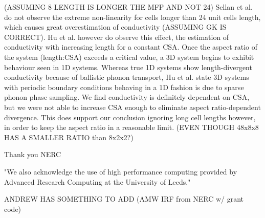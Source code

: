 \documentclass[%
preprint,                                  %
nofootinbib,
 amsmath,amssymb,
 aps,
]{revtex4-1}
\begin{document}
(ASSUMING 8 LENGTH IS LONGER THE MFP AND NOT 24) Sellan et al. do not observe the extreme non-linearity for cells longer than 24 unit cells length, which causes great overestimation of conductivity (ASSUMING GK IS CORRECT). Hu et al. however do observe this effect, the estimation of conductivity with increasing length for a constant CSA. Once the aspect ratio of the system (length:CSA) exceeds a critical value, a 3D system begins to exhibit behaviour seen in 1D systems. Whereas true 1D systems show length-divergent conductivity because of ballistic phonon transport, Hu et al. state 3D systems with periodic boundary conditions behaving in a 1D fashion is due to sparse phonon phase sampling. We find conductivity is definitely dependent on CSA, but we were not able to increase CSA enough to eliminate aspect ratio-dependent divergence. This does support our conclusion ignoring long cell lengths however, in order to keep the aspect ratio in a reasonable limit. (EVEN THOUGH 48x8x8 HAS A SMALLER RATIO than 8x2x2?)

\begin{acknowledgements}
Thank you NERC

"We also acknowledge the use of high performance computing provided by Advanced Research Computing at the University of Leeds."

ANDREW HAS SOMETHING TO ADD (AMW IRF from NERC w/ grant code)
\end{acknowledgements}


\end{document}
